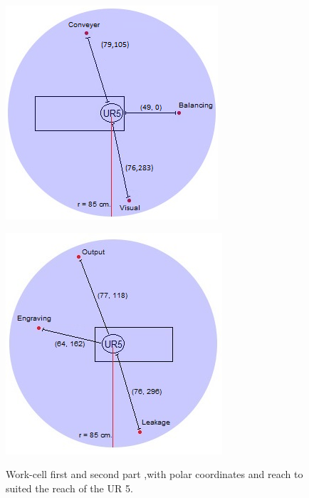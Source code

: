 \begin{figure}[H]
  \centering
  \begin{minipage}[b]{0.45\textwidth}
    \includegraphics[width=\textwidth]{Design/workcell_1_polar.png}
    \label{fig:position}
  \end{minipage}
  \hfill
  \begin{minipage}[b]{0.45\textwidth}
    \includegraphics[width=\textwidth]{Design/polar.jpg}  
    \label{fig:velocity}
  \end{minipage}
  {Work-cell first and second part ,with polar coordinates and reach to suited the reach of the UR 5.}
  \label{fig:firstpart}
\end{figure}

